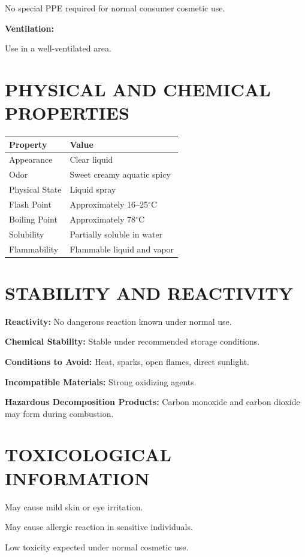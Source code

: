 \documentclass[11pt]{article}
\begin{document}
No special PPE required for normal consumer cosmetic use.

\textbf{Ventilation:}

Use in a well-ventilated area.

\section{PHYSICAL AND CHEMICAL PROPERTIES}

\begin{longtable}{|p{2.5in}|p{3in}|}
\hline
\textbf{Property} & \textbf{Value} \\
\hline
Appearance & Clear liquid \\
\hline
Odor & Sweet creamy aquatic spicy \\
\hline
Physical State & Liquid spray \\
\hline
Flash Point & Approximately 16--25$^\circ$C \\
\hline
Boiling Point & Approximately 78$^\circ$C \\
\hline
Solubility & Partially soluble in water \\
\hline
Flammability & Flammable liquid and vapor \\
\hline
\end{longtable}

\section{STABILITY AND REACTIVITY}

\textbf{Reactivity:} No dangerous reaction known under normal use.

\textbf{Chemical Stability:} Stable under recommended storage conditions.

\textbf{Conditions to Avoid:} Heat, sparks, open flames, direct sunlight.

\textbf{Incompatible Materials:} Strong oxidizing agents.

\textbf{Hazardous Decomposition Products:} Carbon monoxide and carbon dioxide may form during combustion.

\section{TOXICOLOGICAL INFORMATION}

May cause mild skin or eye irritation.

May cause allergic reaction in sensitive individuals.

Low toxicity expected under normal cosmetic use.
\end{document}
